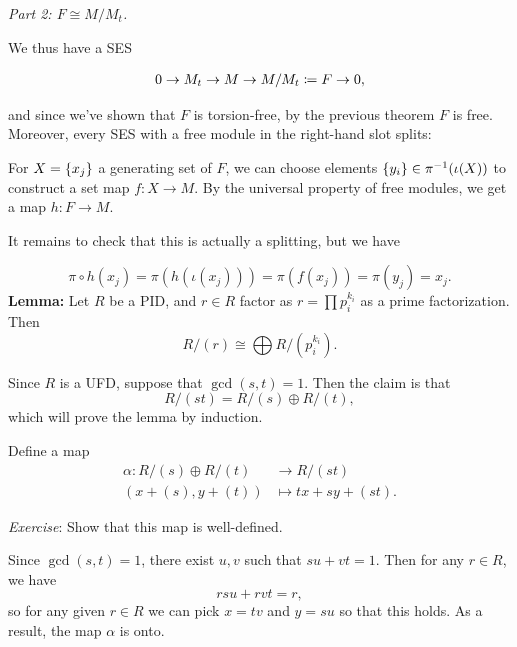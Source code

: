 \emph{Part 2: \(F \cong M/M_t\).}

We thus have a SES

\begin{align*}
0 \to M_t \to M \to M/M_t \coloneqq F \to 0
,\end{align*}

and since we've shown that \(F\) is torsion-free, by the previous
theorem \(F\) is free. Moreover, every SES with a free module in the
right-hand slot splits:

\begin{center}
\end{center}

For \(X = \left\{{x_j}\right\}\) a generating set of \(F\), we can choose
elements \(\left\{{y_i}\right\} \in \pi^{-1}(\iota(X))\) to construct a set map
\(f: X \to M\). By the universal property of free modules, we get a map
\(h: F \to M\).

It remains to check that this is actually a splitting, but we have

\[
\pi \circ h (x_j) = \pi(h(\iota(x_j))) = \pi(f(x_j)) = \pi(y_j) = x_j.
\] \textbf{Lemma:} Let \(R\) be a PID, and \(r\in R\) factor as
\(r = \prod p_i^{k_i}\) as a prime factorization. Then \[
R/(r) \cong \bigoplus R/(p_i^{k_i}).
\]

Since \(R\) is a UFD, suppose that \(\gcd(s ,t) = 1\). Then the claim is
that \[
R/(st) = R/(s) \oplus R/(t)
,\] which will prove the lemma by induction.

Define a map \begin{align*}
\alpha: R/(s) \oplus R/(t) &\to R/(st) \\
(x + (s), y+(t)) &\mapsto tx + sy + (st)
.\end{align*}

\emph{Exercise}: Show that this map is well-defined.

Since \(\gcd(s, t) = 1\), there exist \(u, v\) such that
\(su + vt = 1\). Then for any \(r\in R\), we have \[
rsu + rvt = r
,\] so for any given \(r\in R\) we can pick \(x =tv\) and \(y=su\) so
that this holds. As a result, the map \(\alpha\) is onto.

